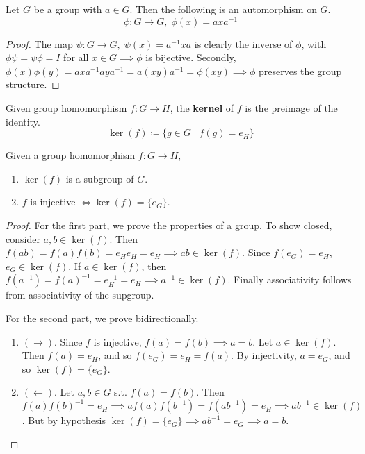   \begin{theorem}
    Let $G$ be a group with $a \in G$. Then the following is an automorphism on $G$. 
    \begin{equation}
      \phi: G \longrightarrow G, \; \phi (x) = a x a^{-1}
    \end{equation}
  \end{theorem}
  \begin{proof}
    The map $\psi: G \longrightarrow G, \; \psi(x) = a^{-1} x a$ is clearly the inverse of $\phi$, with $\phi \psi = \psi \phi = I$ for all $x \in G \implies \phi$ is bijective. Secondly, $\phi(x) \phi(y) = a x a^{-1} a y a^{-1} = a (x y) a ^{-1} = \phi (x y) \implies \phi$ preserves the group structure. 
  \end{proof} 

  \begin{definition}[Kernel]
    Given group homomorphism $f: G \rightarrow H$, the \textbf{kernel} of $f$ is the preimage of the identity. 
    \begin{equation}
      \ker(f) \coloneqq \{g \in G \mid f(g) = e_H\}
    \end{equation}
  \end{definition} 

  \begin{theorem}
    \label{thm:kernels_subgroup}
    Given a group homomorphism $f: G \rightarrow H$, 
    \begin{enumerate}
      \item $\ker(f)$ is a subgroup of $G$.  
      \item $f$ is injective $\iff \ker(f) = \{e_G\}$. 
    \end{enumerate}
  \end{theorem}
  \begin{proof}
    For the first part, we prove the properties of a group. To show closed, consider $a, b \in \ker(f)$. Then $f(ab) = f(a) f(b) = e_H e_H = e_H \implies ab \in \ker(f)$. Since $f(e_G) = e_H$, $e_G \in \ker(f)$. If $a \in \ker(f)$, then $f(a^{-1}) = f(a)^{-1} = e_H^{-1} = e_H \implies a^{-1} \in \ker(f)$. Finally associativity follows from associativity of the supgroup. 

    For the second part, we prove bidirectionally. 
    \begin{enumerate}
      \item $(\rightarrow)$. Since $f$ is injective, $f(a) = f(b) \implies a = b$. Let $a \in \ker(f)$. Then $f(a) = e_H$, and so $f(e_G) = e_H = f(a)$. By injectivity, $a = e_G$, and so $\ker(f) = \{e_G\}$. 
      \item $(\leftarrow)$. Let $a, b \in G$ s.t. $f(a) = f(b)$. Then $f(a) f(b)^{-1} = e_H \implies af(a) f(b^{-1}) = f(a b^{-1}) = e_H \implies ab^{-1} \in \ker(f)$. But by hypothesis $\ker(f) = \{e_G\} \implies ab^{-1} = e_G \implies a = b$. 
    \end{enumerate}
  \end{proof}

